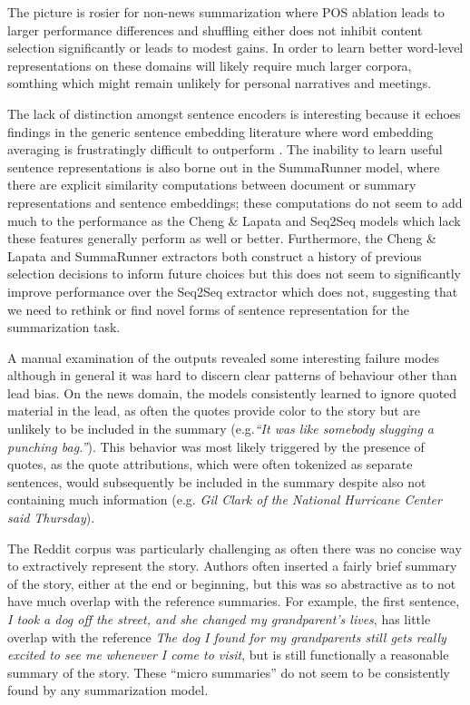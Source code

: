 The picture is rosier for non-news summarization where POS ablation leads
to larger performance differences and shuffling either does not inhibit content
selection significantly or leads to modest gains. In order to learn better
word-level representations on these domains will likely require much
larger corpora, somthing which might remain unlikely for personal narratives
and meetings.



The lack of distinction amongst sentence encoders is interesting because 
it echoes findings in the generic sentence embedding literature 
where word embedding averaging is frustratingly difficult to 
outperform  \cite{wieting2015towards,arora2016simple,wieting2017revisiting}.
The inability to learn useful sentence representations is also 
borne out in the 
SummaRunner model, where there are explicit similarity computations
between document or summary representations and sentence embeddings;
these computations do not seem to add much to the performance as the 
Cheng \& Lapata and Seq2Seq models which lack these features generally
perform as well or better.
Furthermore, the Cheng \& Lapata and SummaRunner extractors both construct
a history of previous selection decisions to inform future choices but this
does not seem to significantly improve performance over the Seq2Seq extractor 
which does not, suggesting that we need to rethink or find novel forms 
of sentence representation for the summarization task.


A manual examination of the outputs revealed some interesting failure modes
although in general it was hard to discern clear patterns of behaviour 
other than lead bias. On the news domain, the models consistently learned 
to ignore quoted material in the lead, as often the quotes provide
color to the story but are unlikely to be included in the summary (e.g.\textit{``It was like somebody slugging a punching bag.''}). 
This behavior was most likely triggered by the presence of quotes, as the
quote attributions, which were often tokenized as separate sentences,
would subsequently be included in the summary despite also not containing 
much information 
(e.g. \textit{Gil Clark of the National Hurricane Center said Thursday}).




The Reddit corpus was particularly challenging as often there was no concise
way to extractively represent the story. Authors often inserted a 
fairly brief summary of the story, either at the end or beginning, but
this was so abstractive as to not have much overlap with the reference
summaries. For example, the first sentence, \textit{I took a dog off the street, and she changed my grandparent's lives}, has little overlap with the reference
\textit{The dog I found for my grandparents still gets really excited to see
me whenever I come to visit}, but is still functionally a reasonable 
summary of the story. These ``micro summaries'' do not seem to be 
consistently found by any summarization model. 



